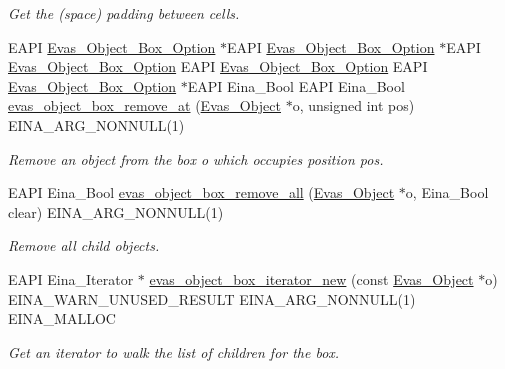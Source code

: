\begin{DoxyCompactItemize}
\begin{DoxyCompactList}\small\item\em Get the (space) padding between cells. \item\end{DoxyCompactList}\item 
EAPI \hyperlink{group__Evas__Object__Box_gabbeb05bf47aaf7681e9d83a1b0055d20}{Evas\_\-Object\_\-Box\_\-Option} $\ast$EAPI \hyperlink{group__Evas__Object__Box_gabbeb05bf47aaf7681e9d83a1b0055d20}{Evas\_\-Object\_\-Box\_\-Option} $\ast$EAPI \hyperlink{group__Evas__Object__Box_gabbeb05bf47aaf7681e9d83a1b0055d20}{Evas\_\-Object\_\-Box\_\-Option} EAPI \hyperlink{group__Evas__Object__Box_gabbeb05bf47aaf7681e9d83a1b0055d20}{Evas\_\-Object\_\-Box\_\-Option} EAPI \hyperlink{group__Evas__Object__Box_gabbeb05bf47aaf7681e9d83a1b0055d20}{Evas\_\-Object\_\-Box\_\-Option} $\ast$EAPI Eina\_\-Bool EAPI Eina\_\-Bool \hyperlink{group__Evas__Object__Box_ga7d6a7321327f1398790d1f12cccd38f3}{evas\_\-object\_\-box\_\-remove\_\-at} (\hyperlink{group__Evas__Object__Group_ga9e19e6dd1f517a0ba437c0114d3e7c97}{Evas\_\-Object} $\ast$o, unsigned int pos) EINA\_\-ARG\_\-NONNULL(1)
\begin{DoxyCompactList}\small\item\em Remove an object from the box {\itshape o\/} which occupies position {\itshape pos\/}. \item\end{DoxyCompactList}\item 
EAPI Eina\_\-Bool \hyperlink{group__Evas__Object__Box_ga6c114f237f66c0208f0669783f671318}{evas\_\-object\_\-box\_\-remove\_\-all} (\hyperlink{group__Evas__Object__Group_ga9e19e6dd1f517a0ba437c0114d3e7c97}{Evas\_\-Object} $\ast$o, Eina\_\-Bool clear) EINA\_\-ARG\_\-NONNULL(1)
\begin{DoxyCompactList}\small\item\em Remove all child objects. \item\end{DoxyCompactList}\item 
EAPI Eina\_\-Iterator $\ast$ \hyperlink{group__Evas__Object__Box_ga2a3ceff4f02512fa7f85618252eacbdc}{evas\_\-object\_\-box\_\-iterator\_\-new} (const \hyperlink{group__Evas__Object__Group_ga9e19e6dd1f517a0ba437c0114d3e7c97}{Evas\_\-Object} $\ast$o) EINA\_\-WARN\_\-UNUSED\_\-RESULT EINA\_\-ARG\_\-NONNULL(1) EINA\_\-MALLOC
\begin{DoxyCompactList}\small\item\em Get an iterator to walk the list of children for the box. \item\end{DoxyCompactList}\item 

\end{DoxyCompactItemize}
